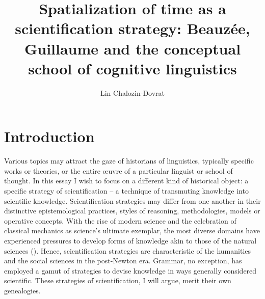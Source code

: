 \documentclass[english,output=paper,colorlinks,citecolor=brown]{../langscibook}
\author{Lin Chalozin-Dovrat\affiliation{Cohn Institute for the History and Philosophy of Science and Ideas, Tel Aviv University}\orcid{}}
\title{Spatialization of time as a scientification strategy: Beauzée, Guillaume and the conceptual school of cognitive linguistics}
\begin{document}
\maketitle

\section{Introduction} 
\largerpage
Various topics may attract the gaze of historians of linguistics, typically specific works or theories, or the entire œuvre of a particular linguist or school of thought. In this essay I wish to focus on a different kind of historical object: a specific strategy of scientification -- a technique of transmuting knowledge into scientific knowledge. Scientification strategies may differ from one another in their distinctive epistemological practices, styles of reasoning, methodologies, models or operative concepts. With the rise of modern science and the celebration of classical mechanics as science’s ultimate exemplar, the most diverse domains have experienced pressures to develop forms of knowledge akin to those of the natural sciences (\citealt{BodMaatEtAl2014}). Hence, scientification strategies are characteristic of the humanities and the social sciences in the post-Newton era. Grammar, no exception, has employed a gamut of strategies to devise knowledge in ways generally considered scientific. These strategies of scientification, I will argue, merit their own genealogies.
\end{document}
